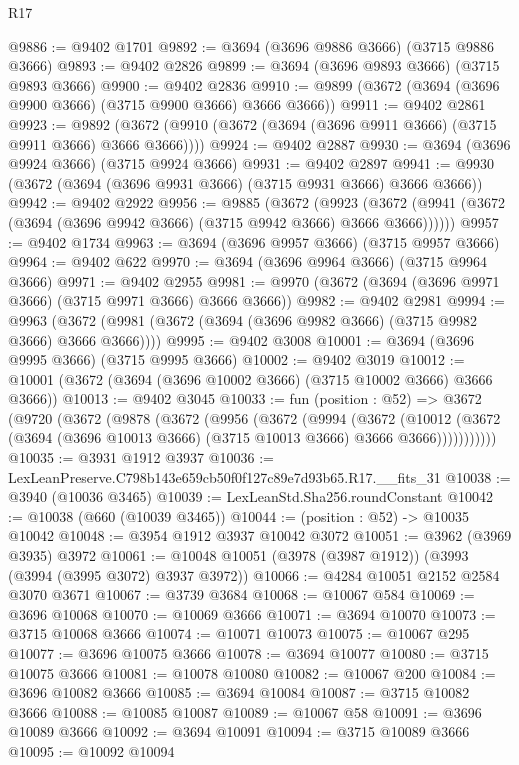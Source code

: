 \begin{lexlean}{R17}
\begin{coremodule}
@9886 := @9402 @1701
@9892 := @3694 (@3696 @9886 @3666) (@3715 @9886 @3666)
@9893 := @9402 @2826
@9899 := @3694 (@3696 @9893 @3666) (@3715 @9893 @3666)
@9900 := @9402 @2836
@9910 := @9899 (@3672 (@3694 (@3696 @9900 @3666) (@3715 @9900 @3666) @3666 @3666))
@9911 := @9402 @2861
@9923 := @9892 (@3672 (@9910 (@3672 (@3694 (@3696 @9911 @3666) (@3715 @9911 @3666) @3666 @3666))))
@9924 := @9402 @2887
@9930 := @3694 (@3696 @9924 @3666) (@3715 @9924 @3666)
@9931 := @9402 @2897
@9941 := @9930 (@3672 (@3694 (@3696 @9931 @3666) (@3715 @9931 @3666) @3666 @3666))
@9942 := @9402 @2922
@9956 := @9885
    (@3672
      (@9923 (@3672 (@9941 (@3672 (@3694 (@3696 @9942 @3666) (@3715 @9942 @3666) @3666 @3666))))))
@9957 := @9402 @1734
@9963 := @3694 (@3696 @9957 @3666) (@3715 @9957 @3666)
@9964 := @9402 @622
@9970 := @3694 (@3696 @9964 @3666) (@3715 @9964 @3666)
@9971 := @9402 @2955
@9981 := @9970 (@3672 (@3694 (@3696 @9971 @3666) (@3715 @9971 @3666) @3666 @3666))
@9982 := @9402 @2981
@9994 := @9963 (@3672 (@9981 (@3672 (@3694 (@3696 @9982 @3666) (@3715 @9982 @3666) @3666 @3666))))
@9995 := @9402 @3008
@10001 := @3694 (@3696 @9995 @3666) (@3715 @9995 @3666)
@10002 := @9402 @3019
@10012 := @10001 (@3672 (@3694 (@3696 @10002 @3666) (@3715 @10002 @3666) @3666 @3666))
@10013 := @9402 @3045
@10033 := fun (position : @52) =>
  @3672
    (@9720
      (@3672
        (@9878
          (@3672
            (@9956
              (@3672
                (@9994
                  (@3672
                    (@10012
                      (@3672 (@3694 (@3696 @10013 @3666) (@3715 @10013 @3666) @3666 @3666)))))))))))
@10035 := @3931 @1912 @3937
@10036 := LexLeanPreserve.C798b143e659cb50f0f127c89e7d93b65.R17.__fits_31
@10038 := @3940 (@10036 @3465)
@10039 := LexLeanStd.Sha256.roundConstant
@10042 := @10038 (@660 (@10039 @3465))
@10044 := (position : @52) -> @10035 @10042
@10048 := @3954 @1912 @3937 @10042 @3072
@10051 := @3962 (@3969 @3935) @3972
@10061 := @10048 @10051 (@3978 (@3987 @1912)) (@3993 (@3994 (@3995 @3072) @3937 @3972))
@10066 := @4284 @10051 @2152 @2584 @3070 @3671
@10067 := @3739 @3684
@10068 := @10067 @584
@10069 := @3696 @10068
@10070 := @10069 @3666
@10071 := @3694 @10070
@10073 := @3715 @10068 @3666
@10074 := @10071 @10073
@10075 := @10067 @295
@10077 := @3696 @10075 @3666
@10078 := @3694 @10077
@10080 := @3715 @10075 @3666
@10081 := @10078 @10080
@10082 := @10067 @200
@10084 := @3696 @10082 @3666
@10085 := @3694 @10084
@10087 := @3715 @10082 @3666
@10088 := @10085 @10087
@10089 := @10067 @58
@10091 := @3696 @10089 @3666
@10092 := @3694 @10091
@10094 := @3715 @10089 @3666
@10095 := @10092 @10094

\end{coremodule}
\end{lexlean}
